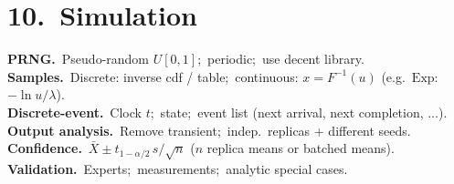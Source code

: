 \section*{10.\ Simulation}
\textbf{PRNG.}\ Pseudo-random $U[0,1]$;\ periodic;\ use decent library.\\
\textbf{Samples.}\ Discrete: inverse cdf / table;\ continuous: $x=F^{-1}(u)$ (e.g.\ $\mathrm{Exp}$: $-\ln u/\lambda$).\\
\textbf{Discrete-event.}\ Clock $t$;\ state;\ event list (next arrival, next completion, $\ldots$).\\
\textbf{Output analysis.}\ Remove transient;\ indep.\ replicas + different seeds.\\
\textbf{Confidence.}\ $\bar X\pm t_{1-\alpha/2}\,s/\sqrt{n}$ ($n$ replica means or batched means).\\
\textbf{Validation.}\ Experts;\ measurements;\ analytic special cases.
